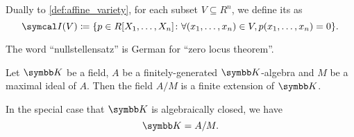 \begin{definition}\label{def:ideal_of_affine_variety}\cite[70]{Коцев2016}
  Dually to \cref{def:affine_variety}, for each subset \( V \subseteq R^n \), we define its  as
  \begin{equation*}
    \Cal{I}(V) \coloneqq \{ p \in R[X_1, \ldots, X_n] \colon \forall (x_1, \ldots, x_n) \in V, p(x_1, \ldots, x_n) = 0 \}.
  \end{equation*}
\end{definition}

\begin{remark}\label{remark:nullstelletsatz_etymology}
  The word \enquote{nullstellensatz} is German for \enquote{zero locus theorem}.
\end{remark}

\begin{theorem}\label{thm:algebraic_nullstellensatz}\cite[64]{Коцев2016}
  Let \( \K \) be a field, \( A \) be a finitely-generated \( \K \)-algebra and \( M \) be a maximal ideal of \( A \). Then the field \( A / M \) is a finite extension of \( \K \).

  In the special case that \( \K \) is algebraically closed, we have
  \begin{equation*}
    \K = A / M.
  \end{equation*}
\end{theorem}

